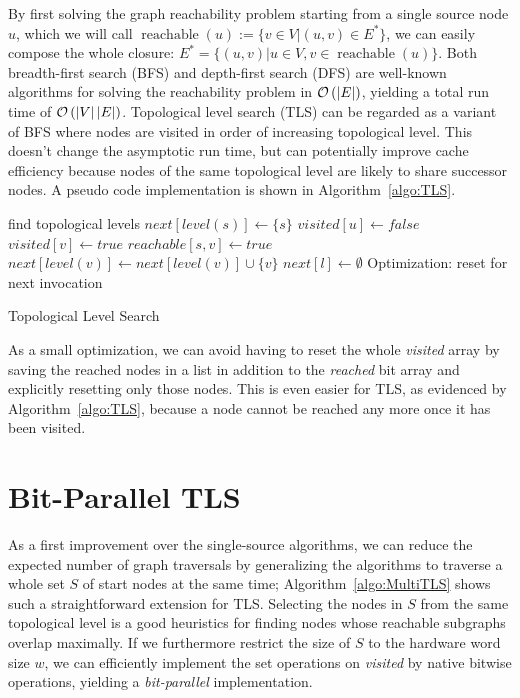 \documentclass[12pt,a4paper,twoside]{article}
\DeclareMathOperator*{\reachable}{reachable}
\begin{document}
By first solving the graph reachability problem starting from a single source node $u$, which we will call $\reachable(u) := \{v \in V | (u, v) \in E^*\}$, we can easily compose the whole closure: $E^* = \{(u, v) | u \in V, v \in \reachable(u)\}$. Both breadth-first search (BFS) and depth-first search (DFS) are well-known algorithms for solving the reachability problem in $\mathcal{O}\left(\left|E\right|\right)$, yielding a total run time of $\mathcal{O}\left(\left|V\right| \left|E\right|\right)$. Topological level search (TLS) can be regarded as a variant of BFS where nodes are visited in order of increasing topological level. This doesn't change the asymptotic run time, but can potentially improve cache efficiency because nodes of the same topological level are likely to share successor nodes. A pseudo code implementation is shown in Algorithm~\ref{algo:TLS}.

\begin{algorithm}
  \begin{algorithmic}
      \State find topological levels
      \State $next[level(s)] \gets \{s\}$
          \State $visited[u] \gets false$
              \State $visited[v] \gets true$
              \State $reachable[s, v] \gets true$
              \State $next[level(v)] \gets next[level(v)] \cup \{v\}$
            \EndIf
          \EndFor
        \EndFor
        \State $next[l] \gets \emptyset$ \Comment Optimization: reset for next invocation
      \EndFor
    \EndFunction
  \end{algorithmic}
  \caption{Topological Level Search}
  \label{algo:TLS}
\end{algorithm}

As a small optimization, we can avoid having to reset the whole \emph{visited} array by saving the reached nodes in a list in addition to the \emph{reached} bit array and explicitly resetting only those nodes. This is even easier for TLS, as evidenced by Algorithm~\ref{algo:TLS}, because a node cannot be reached any more once it has been visited.

\section{Bit-Parallel TLS}

As a first improvement over the single-source algorithms, we can reduce the expected number of graph traversals by generalizing the algorithms to traverse a whole set $S$ of start nodes at the same time; Algorithm~\ref{algo:MultiTLS} shows such a straightforward extension for TLS. Selecting the nodes in $S$ from the same topological level is a good heuristics for finding nodes whose reachable subgraphs overlap maximally. If we furthermore restrict the size of $S$ to the hardware word size $w$, we can efficiently implement the set operations on \emph{visited} by native bitwise operations, yielding a \emph{bit-parallel} implementation.
\end{document}
